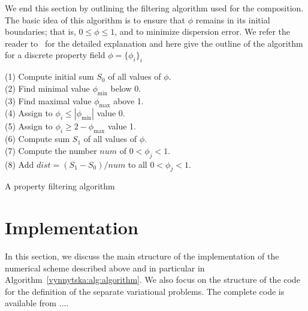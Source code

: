 We end this section by outlining the filtering algorithm used for the
composition. The basic idea of this algorithm is to ensure that
$\phi$ remains in its initial boundaries; that is, $0 \leqslant
\phi \leqslant 1$, and to minimize dispersion error.  We refer the
reader to~\citet{LenardicKaula1993} for the detailed explanation and
here give the outline of the algorithm for a discrete property field
$\phi = \{\phi_i \}_{i}$
\begin{algorithm}
  \begin{tabbing}
  (1) Compute initial sum $S_0$ of all values of $\phi$. \\
  (2) Find minimal value $\phi_{\min}$ below 0. \\
  (3) Find maximal value $\phi_{\max}$ above 1. \\
  (4) Assign to $\phi_i \leqslant | \phi_{\min} |$ value 0. \\
  (5) Assign to $\phi_i \geqslant 2 - \phi_{\max} $ value 1. \\
  (6) Compute sum $S_1$ of all values of $\phi$. \\
  (7) Compute the number $num$ of $0 < \phi_j < 1$. \\
  (8) Add $dist = (S_1 - S_0)/num$ to all $ 0 < \phi_j < 1$.
  \end{tabbing}
  \caption{A property filtering algorithm}
  \label{vynnytska:alg:filtering}
\end{algorithm}


\section{Implementation}

In this section, we discuss the main structure of the implementation
of the numerical scheme described above and in particular in
Algorithm~\ref{vynnytska:alg:algorithm}. We also focus on the
structure of the code for the definition of the separate variational
problems. The complete code is available from $\dots$.

